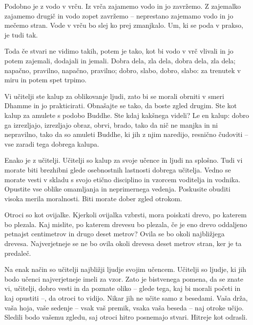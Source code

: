 Podobno je z vodo v vrču. Iz vrča zajamemo vodo in jo zavržemo. Z zajemalko zajamemo drugič in vodo zopet zavržemo – neprestano zajemamo vodo in jo mečemo stran. Vode v vrču bo slej ko prej zmanjkalo. Um, ki se poda v prakso, je tudi tak.

Toda če stvari ne vidimo takih, potem je tako, kot bi vodo v vrč vlivali in jo potem zajemali, dodajali in jemali. Dobra dela, zla dela, dobra dela, zla dela; napačno, pravilno, napačno, pravilno; dobro, slabo, dobro, slabo: za trenutek v miru in potem spet trpimo.

\clearpage


Vi učitelji ste kalup za oblikovanje ljudi, zato bi se morali obrniti v smeri Dhamme in jo prakticirati. Obnašajte se tako, da boste zgled drugim. Ste kot kalup za amulete s podobo Buddhe. Ste kdaj kakšnega videli? Le en kalup: dobro ga izrezljajo, izrezljajo obraz, obrvi, brado, tako da nič ne manjka in ni nepravilno, tako da so amuleti Buddhe, ki jih z njim naredijo, resnično čudoviti – vse zaradi tega dobrega kalupa.

Enako je z učitelji. Učitelji so kalup za svoje učence in ljudi na splošno. Tudi vi morate biti brezhibni glede osebnostnih lastnosti dobrega učitelja. Vedno se morate vesti v skladu s svojo etično disciplino in vzorcem voditelja in vodnika. Opustite vse oblike omamljanja in neprimernega vedenja. Poskusite obuditi visoka merila moralnosti. Biti morate dober zgled otrokom.

\clearpage


Otroci so kot ovijalke. Kjerkoli ovijalka vzbrsti, mora poiskati drevo, po katerem bo plezala. Kaj mislite, po katerem drevesu bo plezala, če je eno drevo oddaljeno petnajst centimetrov in drugo deset metrov? Ovila se bo okoli najbližjega drevesa. Najverjetneje se ne bo ovila okoli drevesa deset metrov stran, ker je ta predaleč.

Na enak način so učitelji najbližji ljudje svojim učencem. Učitelji so ljudje, ki jih bodo učenci najverjetneje imeli za vzor. Zato je bistvenega pomena, da se znate vi, učitelji, dobro vesti in da poznate oliko – glede tega, kaj bi morali početi in kaj opustiti –, da otroci to vidijo. Nikar jih ne učite samo z besedami. Vaša drža, vaša hoja, vaše sedenje – vsak vaš premik, vsaka vaša beseda – naj otroke učijo. Sledili bodo vašemu zgledu, saj otroci hitro posnemajo stvari. Hitreje kot odrasli.

